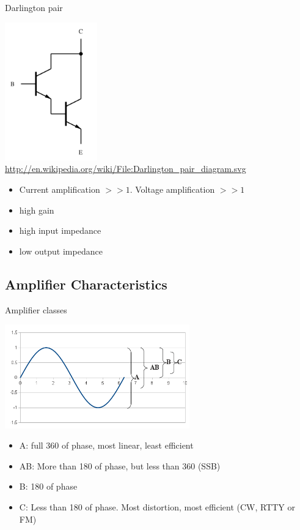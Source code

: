 \documentclass{beamer}
\begin{document}
\begin{frame}{Darlington pair}{}
\begin{center}
\includegraphics[width=0.3\textwidth]{images/Darlington_pair.png}\\
{\tiny \url{http://en.wikipedia.org/wiki/File:Darlington_pair_diagram.svg}}
\end{center}
\begin{itemize}
\item Current amplification $>>1$. Voltage amplification $>> 1$
\item high gain
\item high input impedance
\item low output impedance
\end{itemize}
\end{frame}

\subsection{Amplifier Characteristics}
\begin{frame}{Amplifier classes}{}

\includegraphics[width=0.6\textwidth]{images/amplifierclasses.png}
\begin{itemize}
\item A: full 360 of phase, most linear, least efficient
\item AB: More than 180 of phase, but less than 360 (SSB)
\item B: 180 of phase
\item C: Less than 180 of phase. Most distortion, most efficient (CW, RTTY or FM)
\end{itemize}
\end{frame}
\end{document}
